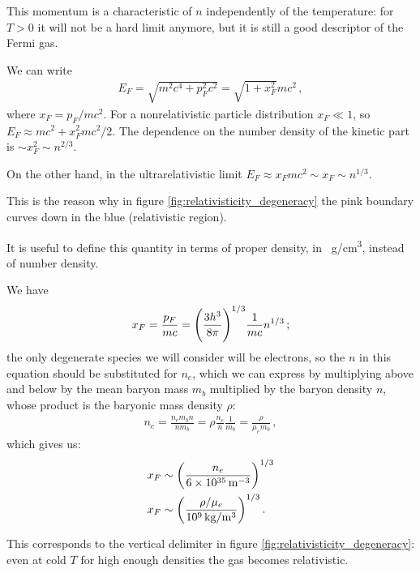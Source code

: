 \documentclass[main.tex]{subfiles}
\begin{document}
This momentum is a characteristic of \(n\) independently of the temperature: for \(T > 0\) it will not be a hard limit anymore, but it is still a good descriptor of the Fermi gas. 

We can write 
%
\begin{align}
E_F = \sqrt{m^2 c^{4} + p_F^2 c^2} = \sqrt{1 + x_F^2} m c^2
\,,
\end{align}
%
where \(x_F = p_F / mc^2\).
For a nonrelativistic particle distribution \(x_F \ll 1\), so \(E_F \approx mc^2 + x_F^2 mc^2/2\). 
The dependence on the number density of the kinetic part is \(\sim x_F^{2} \sim n^{2/3}\). 

On the other hand, in the ultrarelativistic limit \(E_F \approx x_F mc^2 \sim x_F \sim n^{1/3}\).

This is the reason why in figure \ref{fig:relativisticity_degeneracy} the pink boundary curves down in the blue (relativistic region). 

It is useful to define this quantity in terms of proper density, in \SI{}{g/cm^3}, instead of number density.

We have 
%
\begin{align}
x_F = \frac{p_F}{mc} = \qty( \frac{3h^3}{8 \pi })^{1/3} \frac{1}{mc} n^{1/3}
\,;
\end{align}
%
the only degenerate species we will consider will be electrons, so the \(n\) in this equation should be substituted for \(n_e\), which we can express
by multiplying above and below by the mean baryon mass \(m_b\) multiplied by the baryon density \(n\), whose product is the baryonic mass density \(\rho \):
%
\begin{align}
n_e = \frac{n_e m_b n}{n m_b} 
= \rho \frac{n_e}{n} \frac{1}{m_b}
= \frac{\rho}{\mu _e m_b} 
\,,
\end{align}
%
which gives us: 
%
\begin{align}
x_F &\sim \qty( \frac{n_e}{\SI{6e35}{m^{-3}}})^{1/3} \\
x_F &\sim \qty( \frac{\rho / \mu _e}{\SI{e9}{kg / m^3}})^{1/3}
\,.
\end{align}

This corresponds to the vertical delimiter in figure \ref{fig:relativisticity_degeneracy}: even at cold \(T\) for high enough densities the gas becomes relativistic.
\end{document}

